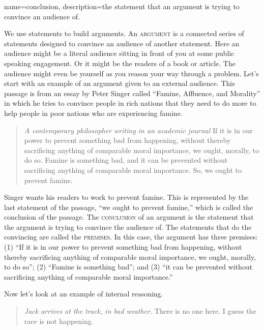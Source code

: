 {
name=conclusion,
description={the statement that an argument is trying to convince an audience of.}
}

 
We use statements to build arguments. An \textsc{\gls{argument}} \label{def:Argument} is a connected series of statements designed to convince an audience of another statement. Here an audience might be a literal audience sitting in front of you at some public speaking engagement. Or it might be the readers of a book or article. The audience might even be yourself as you reason your way through a problem. Let's start with an example of an argument given to an external audience. This passage is from an essay by Peter Singer called ``Famine, Affluence, and Morality'' in which he tries to convince people in rich nations that they need to do more to help people in poor nations who are experiencing famine.

\begin{quotation}\noindent \textit{A contemporary philosopher writing in an academic journal} If it is in our power to prevent something bad from happening, without thereby sacrificing anything of comparable moral importance, we ought, morally, to do so. Famine is something bad, and it can be prevented without sacrificing anything of comparable moral importance. So, we ought to prevent famine. \citep{Singer1972} \label{singer_quote} \end{quotation} 

Singer wants his readers to work to prevent famine. This is represented by the last statement of the passage, ``we ought to prevent famine,'' which is called the conclusion of the passage. The \textsc{\gls{conclusion}} \label{def:conclusion} of an argument is the statement that the argument is trying to convince the audience of. The statements that do the convincing are called the \textsc{\glspl{premise}}. \label{def:premise}In this case, the argument has three premises: (1) ``If it is in our power to prevent something bad from happening, without thereby sacrificing anything of comparable moral importance, we ought, morally, to do so''; (2) ``Famine is something bad''; and (3) ``it can be prevented without sacrificing anything of comparable moral importance.''

Now let's look at an example of internal reasoning. 

\begin{quotation}\noindent\textit{Jack arrives at the track, in bad weather.} There is no one here. I guess the race is not happening. \label{racetrack}
\end{quotation}

